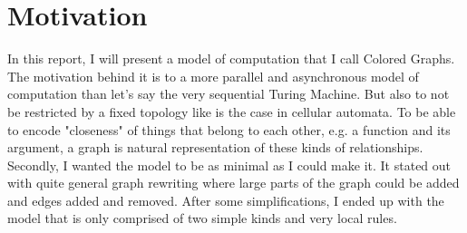 \section{Motivation}

In this report, I will present a model of computation that I call Colored Graphs.
The motivation behind it is to a more parallel and asynchronous model of computation than let's say the very sequential Turing Machine.
But also to not be restricted by a fixed topology like is the case in cellular automata.
To be able to encode "closeness" of things that belong to each other, e.g. a function and its argument, a graph is natural representation of these kinds of relationships.
Secondly, I wanted the model to be as minimal as I could make it.
It stated out with quite general graph rewriting where large parts of the graph could be added and edges added and removed.
After some simplifications, I ended up with the model that is only comprised of two simple kinds and very local rules.
